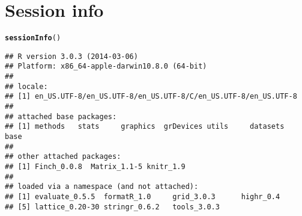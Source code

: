 \documentclass{article}\usepackage[]{graphicx}\usepackage[]{color}
\makeatletter
\newcommand{\hlstd}[1]{\textcolor[rgb]{0.345,0.345,0.345}{#1}}%
\newcommand{\hlkwd}[1]{\textcolor[rgb]{0.737,0.353,0.396}{\textbf{#1}}}%
\newenvironment{kframe}{%
 \def\at@end@of@kframe{}%
 \ifinner\ifhmode%
  \def\at@end@of@kframe{\end{minipage}}%
  \begin{minipage}{\columnwidth}%
 \fi\fi%
 \def\FrameCommand##1{\hskip\@totalleftmargin \hskip-\fboxsep
 \colorbox{shadecolor}{##1}\hskip-\fboxsep
     \hskip-\linewidth \hskip-\@totalleftmargin \hskip\columnwidth}%
 \MakeFramed {\advance\hsize-\width
   \@totalleftmargin\z@ \linewidth\hsize
   \@setminipage}}%
 {\par\unskip\endMakeFramed%
 \at@end@of@kframe}
\newenvironment{knitrout}{}{} %
\makeatother
\begin{document}
\section{Session info}
\label{sec.sessioninfo}

\begin{knitrout}
\color{fgcolor}\begin{kframe}
\begin{alltt}
\hlkwd{sessionInfo}\hlstd{()}
\end{alltt}
\begin{verbatim}
## R version 3.0.3 (2014-03-06)
## Platform: x86_64-apple-darwin10.8.0 (64-bit)
## 
## locale:
## [1] en_US.UTF-8/en_US.UTF-8/en_US.UTF-8/C/en_US.UTF-8/en_US.UTF-8
## 
## attached base packages:
## [1] methods   stats     graphics  grDevices utils     datasets  base     
## 
## other attached packages:
## [1] Finch_0.0.8  Matrix_1.1-5 knitr_1.9   
## 
## loaded via a namespace (and not attached):
## [1] evaluate_0.5.5  formatR_1.0     grid_3.0.3      highr_0.4      
## [5] lattice_0.20-30 stringr_0.6.2   tools_3.0.3
\end{verbatim}
\end{kframe}
\end{knitrout}



\end{document}
